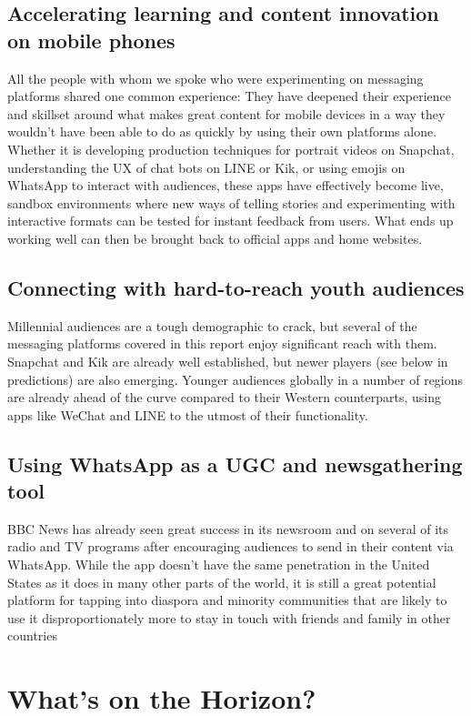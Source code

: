 \documentclass[notoc, symmetric, nobib, nols]{towcenter-guideto-book}
\begin{document}
\subsection{Accelerating learning and content innovation on mobile phones}
All the people with whom we spoke who were experimenting on messaging platforms shared one common experience: They have deepened their experience and skillset around what makes great content for mobile devices in a way they wouldn't have been able to do as quickly by using their own platforms alone. Whether it is developing production techniques for portrait videos on Snapchat, understanding the UX of chat bots on LINE or Kik, or using emojis on WhatsApp to interact with audiences, these apps have effectively become live, sandbox environments where new ways of telling stories and experimenting with interactive formats can be tested for instant feedback from users. What ends up working well can then be brought back to official apps and home websites.

\subsection{Connecting with hard-to-reach youth audiences}
Millennial audiences are a tough demographic to crack, but several of the messaging platforms covered in this report enjoy significant reach with them. Snapchat and Kik are already well established, but newer players (see below in predictions) are also emerging. Younger audiences globally in a number of regions are already ahead of the curve compared to their Western counterparts, using apps like WeChat and LINE to the utmost of their functionality. 

\subsection{Using WhatsApp as a UGC and newsgathering tool} 
BBC News has already seen great success in its newsroom and on several of its radio and TV programs after encouraging audiences to send in their content via WhatsApp. While the app doesn't have the same penetration in the United States as it does in many other parts of the world, it is still a great potential platform for tapping into diaspora and minority communities that are likely to use it disproportionately more to stay in touch with friends and family in other countries

\section{What's on the Horizon?}
\end{document}
